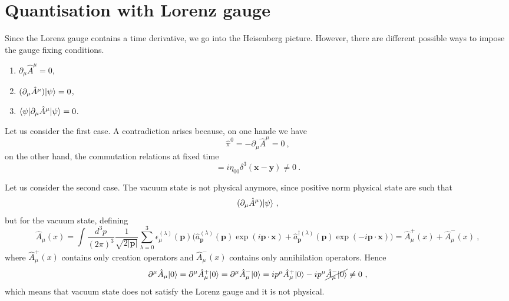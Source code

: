 \section{Quantisation with Lorenz gauge}

    Since the Lorenz gauge contains a time derivative, we go into the Heisenberg picture. However, there are different possible ways to impose the gauge fixing conditions. 
    \begin{enumerate}
        \item $\partial_\mu \hat A^\mu = 0$, 
        \item $(\partial_\mu \hat A^\mu) \vert\psi\rangle = 0$, 
        \item $\langle\psi\vert \partial_\mu \hat A^\mu \vert\psi\rangle = 0$.
    \end{enumerate}

    Let us consider the first case. A contradiction arises because, on one hande we have 
    \begin{equation*}
        \hat \pi^0 = - \partial_\mu \hat A^\mu = 0 ~,
    \end{equation*}
    on the other hand, the commutation relations at fixed time
    \begin{equation*}
        [\hat A_0 (\mathbf x), \hat \pi_0 (\mathbf y)] = i \eta_{00} \delta^3 (\mathbf x - \mathbf y) \neq 0 ~.
    \end{equation*}

    Let us consider the second case. The vacuum state is not physical anymore, since positive norm physical state are such that
    \begin{equation*}
        (\partial_\mu \hat A^\mu) \vert\psi\rangle ~,
    \end{equation*}
    but for the vacuum state, defining
    \begin{equation*}
        \hat A_\mu (x) = \int \frac{d^3 p}{(2\pi)^3} \frac{1}{\sqrt{2 |\mathbf p|}} \sum_{\lambda=0}^{3} \epsilon_\mu^{(\lambda)} (\mathbf p) \Big ( \hat a_{\mathbf p}^{(\lambda)} (\mathbf p) \exp(i \mathbf p \cdot \mathbf x) + \hat a_{\mathbf p}^{\dagger (\lambda)} (\mathbf p) \exp(- i \mathbf p \cdot \mathbf x) \Big) = \hat A^+_\mu (x) + \hat A^-_\mu (x) ~,
    \end{equation*}
    where $\hat A^+_\mu (x)$ contains only creation operators and $\hat A^-_\mu (x)$ contains only annihilation operators. Hence 
    \begin{equation*}
        \partial^\mu \hat A_\mu \vert0\rangle = \partial^\mu \hat A_\mu^+ \vert0\rangle = \partial^\mu \hat A_\mu^- \vert0\rangle = i p^\mu \hat A_\mu^+ \vert0\rangle - i p^\mu \cancel{\hat A_\mu^- \vert0\rangle} \neq 0 ~,
    \end{equation*}
    which means that vacuum state does not satisfy the Lorenz gauge and it is not physical.

